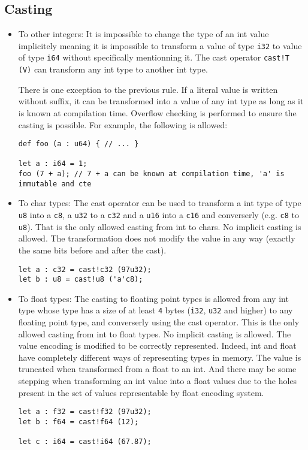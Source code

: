 \subsection{Casting}
\label{sec:orgfdc3d25}

\begin{itemize}
\item To other integers: It is impossible to change the type of an int value implicitely meaning it is
  impossible to transform a value of type \texttt{i32} to value of type \texttt{i64} without
  specifically mentionning it. The cast operator \texttt{cast!T (V)} can transform any int
  type to another int type.

  There is one exception to the previous rule. If a literal value is written
  without suffix, it can be transformed into a value of any int type as long as
  it is known at compilation time. Overflow checking is performed to ensure the
  casting is possible. For example, the following is allowed:

  \begin{lstlisting}[style=coloredverbatim]
def foo (a : u64) { // ... }

let a : i64 = 1;
foo (7 + a); // 7 + a can be known at compilation time, 'a' is immutable and cte
  \end{lstlisting}

\item To char types: The cast operator can be used to transform a int type of type \texttt{u8} into a
  \texttt{c8}, a \texttt{u32} to a \texttt{c32} and a \texttt{u16} into a \texttt{c16} and converserly (e.g. \texttt{c8} to \texttt{u8}). That is the only allowed casting from int to chars. No implicit
  casting is allowed. The transformation does not modify the value in any way
  (exactly the same bits before and after the cast).
  \begin{lstlisting}[style=coloredverbatim]
let a : c32 = cast!c32 (97u32);
let b : u8 = cast!u8 ('a'c8);
  \end{lstlisting}

\item To float types: The casting to floating point types is allowed from any int type whose type
  has a size of at least \texttt{4} bytes (\texttt{i32}, \texttt{u32} and higher) to any floating
  point type, and converserly using the cast operator. This is the only allowed
  casting from int to float types. No implicit casting is allowed. The value
  encoding is modified to be correctly represented. Indeed, int and float have
  completely different ways of representing types in memory. The value is
  truncated when transformed from a float to an int. And there may be some
  stepping when transforming an int value into a float values due to the holes
  present in the set of values representable by float encoding system.

  \begin{lstlisting}[style=coloredverbatim]
let a : f32 = cast!f32 (97u32);
let b : f64 = cast!f64 (12);

let c : i64 = cast!i64 (67.87);
  \end{lstlisting}

\end{itemize}

